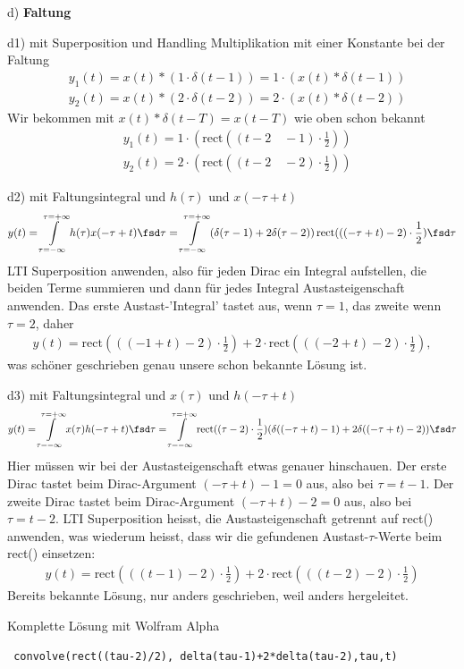 \begin{ExCalc}
d) \textbf{Faltung}

\noindent d1) mit Superposition und Handling Multiplikation mit einer Konstante bei der Faltung
%
\begin{align}
&y_1(t) = x(t) \ast (1\cdot \delta(t-1)) =  1 \cdot (x(t) \ast \delta(t-1))\\
&y_2(t) = x(t) \ast (2\cdot \delta(t-2)) = 2 \cdot (x(t) \ast \delta(t-2))
\end{align}
%
Wir bekommen mit $x(t) \ast \delta(t-T) = x(t-T)$ wie oben schon bekannt
\begin{align}
&y_1(t) = 1 \cdot (\text{rect}\left((t-2 \quad - 1) \cdot \frac{1}{2}\right))\\
&y_2(t) = 2 \cdot (\text{rect}\left((t-2 \quad - 2) \cdot \frac{1}{2}\right))
\end{align}

\noindent d2) mit Faltungsintegral und $h(\tau)$ und $x(-\tau+t)$
\begin{align}
y(t) = \int\limits_{\tau=-\infty}^{\tau=+\infty} h(\tau) x(-\tau+t)\fsd\tau
= \int\limits_{\tau=-\infty}^{\tau=+\infty}
\left(\delta(\tau-1) + 2\delta(\tau-2)\right)\text{rect}(((-\tau+t)-2) \cdot \frac{1}{2})
\fsd\tau
\end{align}
LTI Superposition anwenden, also für jeden Dirac ein Integral aufstellen, die beiden Terme summieren und dann für jedes Integral Austasteigenschaft anwenden.
%
Das erste Austast-'Integral' tastet aus, wenn $\tau=1$, das zweite wenn $\tau=2$, daher
\begin{align}
y(t) =
\text{rect}(((-1+t)-2) \cdot \frac{1}{2}) + 2\cdot\text{rect}(((-2+t)-2) \cdot \frac{1}{2}),
\end{align}
was schöner geschrieben genau unsere schon bekannte Lösung ist.

\noindent d3) mit Faltungsintegral und $x(\tau)$ und $h(-\tau+t)$
\begin{align}
y(t) = \int\limits_{\tau=-\infty}^{\tau=+\infty} x(\tau) h(-\tau+t)\fsd\tau
= \int\limits_{\tau=-\infty}^{\tau=+\infty} \text{rect}((\tau-2) \cdot \frac{1}{2}) (\delta((-\tau+t)-1) + 2\delta((-\tau+t)-2)) \fsd\tau
\end{align}
Hier müssen wir bei der Austasteigenschaft etwas genauer hinschauen.
%
Der erste Dirac tastet beim Dirac-Argument $(-\tau+t)-1 = 0$ aus, also bei $\tau = t-1$.
%
Der zweite Dirac tastet beim Dirac-Argument $(-\tau+t)-2 = 0$ aus, also bei $\tau = t-2$.
%
LTI Superposition heisst, die Austasteigenschaft getrennt auf rect() anwenden, was wiederum heisst, dass
wir die gefundenen Austast-$\tau$-Werte beim rect() einsetzen:
\begin{align}
y(t) = \text{rect}(((t-1)-2) \cdot \frac{1}{2}) + 2\cdot\text{rect}(((t-2)-2) \cdot \frac{1}{2})
\end{align}
Bereits bekannte Lösung, nur anders geschrieben, weil anders hergeleitet.

\noindent Komplette Lösung mit Wolfram Alpha

\verb| convolve(rect((tau-2)/2), delta(tau-1)+2*delta(tau-2),tau,t) |
\end{ExCalc}

